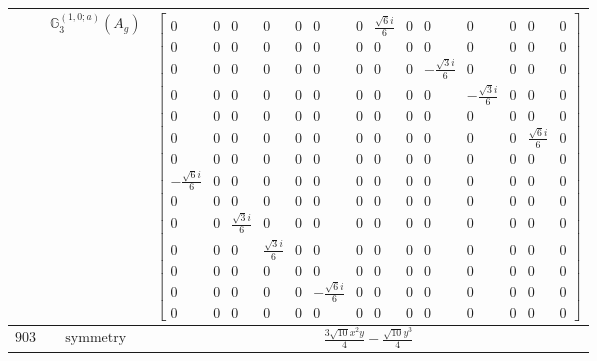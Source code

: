 \documentclass[fleqn,8pt,landscape]{jsarticle}
\begin{document}
\begin{longtable}{ccc}
$  $ & $ \mathbb{G}_{3}^{(1,0;a)}(A_{g}) $ & $ \begin{bmatrix} 0 & 0 & 0 & 0 & 0 & 0 & 0 & \frac{\sqrt{6} i}{6} & 0 & 0 & 0 & 0 & 0 & 0 \\ 0 & 0 & 0 & 0 & 0 & 0 & 0 & 0 & 0 & 0 & 0 & 0 & 0 & 0 \\ 0 & 0 & 0 & 0 & 0 & 0 & 0 & 0 & 0 & - \frac{\sqrt{3} i}{6} & 0 & 0 & 0 & 0 \\ 0 & 0 & 0 & 0 & 0 & 0 & 0 & 0 & 0 & 0 & - \frac{\sqrt{3} i}{6} & 0 & 0 & 0 \\ 0 & 0 & 0 & 0 & 0 & 0 & 0 & 0 & 0 & 0 & 0 & 0 & 0 & 0 \\ 0 & 0 & 0 & 0 & 0 & 0 & 0 & 0 & 0 & 0 & 0 & 0 & \frac{\sqrt{6} i}{6} & 0 \\ 0 & 0 & 0 & 0 & 0 & 0 & 0 & 0 & 0 & 0 & 0 & 0 & 0 & 0 \\ - \frac{\sqrt{6} i}{6} & 0 & 0 & 0 & 0 & 0 & 0 & 0 & 0 & 0 & 0 & 0 & 0 & 0 \\ 0 & 0 & 0 & 0 & 0 & 0 & 0 & 0 & 0 & 0 & 0 & 0 & 0 & 0 \\ 0 & 0 & \frac{\sqrt{3} i}{6} & 0 & 0 & 0 & 0 & 0 & 0 & 0 & 0 & 0 & 0 & 0 \\ 0 & 0 & 0 & \frac{\sqrt{3} i}{6} & 0 & 0 & 0 & 0 & 0 & 0 & 0 & 0 & 0 & 0 \\ 0 & 0 & 0 & 0 & 0 & 0 & 0 & 0 & 0 & 0 & 0 & 0 & 0 & 0 \\ 0 & 0 & 0 & 0 & 0 & - \frac{\sqrt{6} i}{6} & 0 & 0 & 0 & 0 & 0 & 0 & 0 & 0 \\ 0 & 0 & 0 & 0 & 0 & 0 & 0 & 0 & 0 & 0 & 0 & 0 & 0 & 0 \end{bmatrix} $ \\ \hline
$ 903 $ & $ \text{symmetry} $ & $ \frac{3 \sqrt{10} x^{2} y}{4} - \frac{\sqrt{10} y^{3}}{4} $ \\

\end{longtable}
\end{document}
